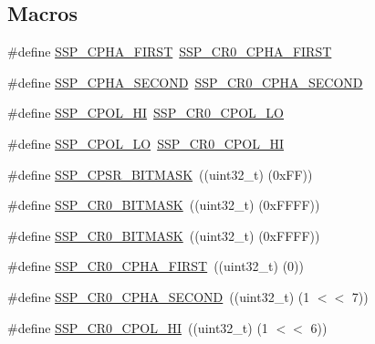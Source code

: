 \subsection*{Macros}
\begin{DoxyCompactItemize}
\item 
\#define \hyperlink{group__SSP__17XX__40XX_ga6333b5eaf9d5301431fc0399c0d417d5}{S\+S\+P\+\_\+\+C\+P\+H\+A\+\_\+\+F\+I\+R\+ST}~\hyperlink{group__SSP__17XX__40XX_gaee3465bdb33add1970f6ce7f7bc638c4}{S\+S\+P\+\_\+\+C\+R0\+\_\+\+C\+P\+H\+A\+\_\+\+F\+I\+R\+ST}
\item 
\#define \hyperlink{group__SSP__17XX__40XX_ga04ad38295445819979f55503eed5c177}{S\+S\+P\+\_\+\+C\+P\+H\+A\+\_\+\+S\+E\+C\+O\+ND}~\hyperlink{group__SSP__17XX__40XX_gae4150d0b2513ff70568be15c2170c9ea}{S\+S\+P\+\_\+\+C\+R0\+\_\+\+C\+P\+H\+A\+\_\+\+S\+E\+C\+O\+ND}
\item 
\#define \hyperlink{group__SSP__17XX__40XX_gaf64aec37a92ca6c14c23af6fc0052ccb}{S\+S\+P\+\_\+\+C\+P\+O\+L\+\_\+\+HI}~\hyperlink{group__SSP__17XX__40XX_gab4353fed07ef845a3796e154397f7e76}{S\+S\+P\+\_\+\+C\+R0\+\_\+\+C\+P\+O\+L\+\_\+\+LO}
\item 
\#define \hyperlink{group__SSP__17XX__40XX_ga1e10eccdb2b293607764028aab1b98a9}{S\+S\+P\+\_\+\+C\+P\+O\+L\+\_\+\+LO}~\hyperlink{group__SSP__17XX__40XX_ga36d7ad75edb14d318d710f964384f466}{S\+S\+P\+\_\+\+C\+R0\+\_\+\+C\+P\+O\+L\+\_\+\+HI}
\item 
\#define \hyperlink{group__SSP__17XX__40XX_gad90cbeb91495d457ae2dd8bda909a2a9}{S\+S\+P\+\_\+\+C\+P\+S\+R\+\_\+\+B\+I\+T\+M\+A\+SK}~((uint32\+\_\+t) (0x\+F\+F))
\item 
\#define \hyperlink{group__SSP__17XX__40XX_ga90be93bebdbdfee011d90ea6e054260a}{S\+S\+P\+\_\+\+C\+R0\+\_\+\+B\+I\+T\+M\+A\+SK}~((uint32\+\_\+t) (0x\+F\+F\+F\+F))
\item 
\#define \hyperlink{group__SSP__17XX__40XX_ga90be93bebdbdfee011d90ea6e054260a}{S\+S\+P\+\_\+\+C\+R0\+\_\+\+B\+I\+T\+M\+A\+SK}~((uint32\+\_\+t) (0x\+F\+F\+F\+F))
\item 
\#define \hyperlink{group__SSP__17XX__40XX_gaee3465bdb33add1970f6ce7f7bc638c4}{S\+S\+P\+\_\+\+C\+R0\+\_\+\+C\+P\+H\+A\+\_\+\+F\+I\+R\+ST}~((uint32\+\_\+t) (0))
\item 
\#define \hyperlink{group__SSP__17XX__40XX_gae4150d0b2513ff70568be15c2170c9ea}{S\+S\+P\+\_\+\+C\+R0\+\_\+\+C\+P\+H\+A\+\_\+\+S\+E\+C\+O\+ND}~((uint32\+\_\+t) (1 $<$$<$ 7))
\item 
\#define \hyperlink{group__SSP__17XX__40XX_ga36d7ad75edb14d318d710f964384f466}{S\+S\+P\+\_\+\+C\+R0\+\_\+\+C\+P\+O\+L\+\_\+\+HI}~((uint32\+\_\+t) (1 $<$$<$ 6))

\end{DoxyCompactItemize}
